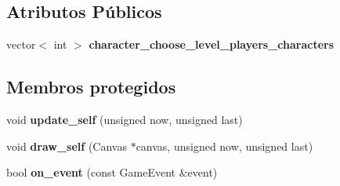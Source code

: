 \subsection*{Atributos Públicos}
\begin{DoxyCompactItemize}
\item 
\mbox{\label{classCharacterChooseLevel_a971370beafa7380fd2472f699ff6e40f}} 
vector$<$ int $>$ {\bfseries character\+\_\+choose\+\_\+level\+\_\+players\+\_\+characters}
\end{DoxyCompactItemize}
\subsection*{Membros protegidos}
\begin{DoxyCompactItemize}
\item 
\mbox{\label{classCharacterChooseLevel_a28a65c50ef528b2fb2d12ebef93e7426}} 
void {\bfseries update\+\_\+self} (unsigned now, unsigned last)
\item 
\mbox{\label{classCharacterChooseLevel_ac124d3fb4690e5b369a95f49758592ca}} 
void {\bfseries draw\+\_\+self} (Canvas $\ast$canvas, unsigned now, unsigned last)
\item 
\mbox{\label{classCharacterChooseLevel_a2fb500ba943a4f22ed01be915b59452a}} 
bool {\bfseries on\+\_\+event} (const Game\+Event \&event)
\end{DoxyCompactItemize}
